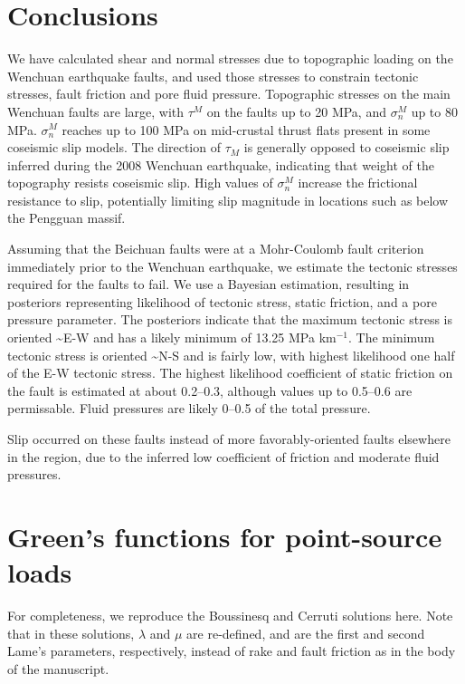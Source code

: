 \documentclass[twocolumn,jgrga]{AGUTeX}
\begin{document}
\begin{article}
{{\section{Conclusions}\label{conclusions}

We have calculated shear and normal stresses due to topographic loading
on the Wenchuan earthquake faults, and used those stresses to constrain
tectonic stresses, fault friction and pore fluid pressure. Topographic
stresses on the main Wenchuan faults are large, with $\tau^M$ on the
faults up to \textbar{}20\textbar{} MPa, and $\sigma^M_n$ up to 80 MPa.
$\sigma^M_n$ reaches up to 100 MPa on mid-crustal thrust flats present
in some coseismic slip models. The direction of $\tau_M$ is generally
opposed to coseismic slip inferred during the 2008 Wenchuan earthquake,
indicating that weight of the topography resists coseismic slip. High
values of $\sigma^M_n$ increase the frictional resistance to slip,
potentially limiting slip magnitude in locations such as below the
Pengguan massif.

Assuming that the Beichuan faults were at a Mohr-Coulomb fault criterion
immediately prior to the Wenchuan earthquake, we estimate the tectonic
stresses required for the faults to fail. We use a Bayesian estimation,
resulting in posteriors representing likelihood of tectonic stress,
static friction, and a pore pressure parameter. The posteriors
indicate that the maximum tectonic stress is oriented
\textasciitilde{}E-W and has a likely minimum of 13.25 MPa km$^{-1}$.
The minimum tectonic stress is oriented \textasciitilde{}N-S and is
fairly low, with highest likelihood one half of the E-W tectonic stress.
The highest likelihood coefficient of static friction on the fault is
estimated at about 0.2--0.3, although values up to 0.5--0.6 are
permissable. Fluid pressures are likely 0--0.5 of the total pressure.

Slip occurred on these faults instead of more favorably-oriented faults
elsewhere in the region, due to the inferred low coefficient of friction
and moderate fluid pressures.

\appendix

\section{Green's functions for point-source
loads}\label{greens-functions-for-point-source-loads}
For completeness, we reproduce the Boussinesq \citep[e.g.,][]{jeffreys1970}
and Cerruti \citep[e.g.,][]{love1927} solutions here.
Note that in these solutions, $\lambda$ and $\mu$ are re-defined, and
are the first and second Lame's parameters, respectively, instead of
rake and fault friction as in the body of the manuscript.

}}
\end{article}
\end{document}
